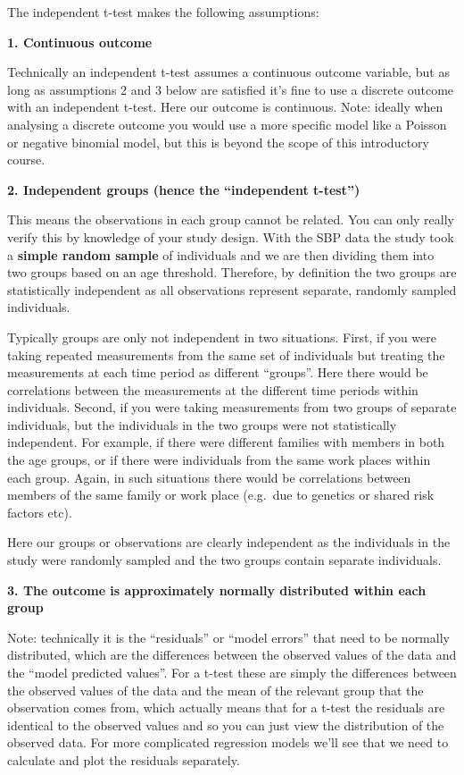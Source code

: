 \documentclass[
]{book}
\begin{document}
The independent t-test makes the following assumptions:

\textbf{1. Continuous outcome}

Technically an independent t-test assumes a continuous outcome variable, but as long as assumptions 2 and 3 below are satisfied it's fine to use a discrete outcome with an independent t-test. Here our outcome is continuous. Note: ideally when analysing a discrete outcome you would use a more specific model like a Poisson or negative binomial model, but this is beyond the scope of this introductory course.

\textbf{2. Independent groups (hence the ``independent t-test'')}

This means the observations in each group cannot be related. You can only really verify this by knowledge of your study design. With the SBP data the study took a \textbf{simple random sample} of individuals and we are then dividing them into two groups based on an age threshold. Therefore, by definition the two groups are statistically independent as all observations represent separate, randomly sampled individuals.

Typically groups are only not independent in two situations. First, if you were taking repeated measurements from the same set of individuals but treating the measurements at each time period as different ``groups''. Here there would be correlations between the measurements at the different time periods within individuals. Second, if you were taking measurements from two groups of separate individuals, but the individuals in the two groups were not statistically independent. For example, if there were different families with members in both the age groups, or if there were individuals from the same work places within each group. Again, in such situations there would be correlations between members of the same family or work place (e.g.~due to genetics or shared risk factors etc).

Here our groups or observations are clearly independent as the individuals in the study were randomly sampled and the two groups contain separate individuals.

\textbf{3. The outcome is approximately normally distributed within each group}

Note: technically it is the ``residuals'' or ``model errors'' that need to be normally distributed, which are the differences between the observed values of the data and the ``model predicted values''. For a t-test these are simply the differences between the observed values of the data and the mean of the relevant group that the observation comes from, which actually means that for a t-test the residuals are identical to the observed values and so you can just view the distribution of the observed data. For more complicated regression models we'll see that we need to calculate and plot the residuals separately.
\end{document}
